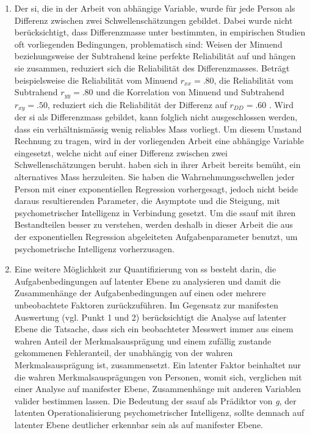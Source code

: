 \documentclass[11pt, twoside, a4paper]{book}		%
\begin{document}
\begin{enumerate}
	\item Der \gls{si}, die in der Arbeit von \citet{Melnick2013} abhängige Variable, wurde für jede Person als Differenz zwischen zwei Schwellenschätzungen gebildet. Dabei wurde nicht berücksichtigt, dass Differenzmasse unter bestimmten, in empirischen Studien oft vorliegenden Bedingungen, problematisch sind: Weisen der Minuend  beziehungsweise der Subtrahend keine perfekte Reliabilität auf und hängen sie zusammen, reduziert sich die Reliabilität des Differenzmasses. Beträgt beispielsweise die Reliabilität vom Minuend $r_{xx} = .80$, die Reliabilität vom Subtrahend $r_{yy} = .80$ und die Korrelation von Minuend und Subtrahend $r_{xy} = .50$, reduziert sich die Reliabilität der Differenz auf $r_{DD} = .60$ \citep[][S. 145]{Murphy2005}. Wird der \gls{si} als Differenzmass gebildet, kann folglich nicht ausgeschlossen werden, dass ein verhältnismässig wenig reliables Mass vorliegt. Um diesem Umstand Rechnung zu tragen, wird in der vorliegenden Arbeit eine abhängige Variable eingesetzt, welche nicht auf einer Differenz zwischen zwei Schwellenschätzungen beruht. \citeauthor{Melnick2013} haben sich in ihrer Arbeit bereits bemüht, ein alternatives Mass herzuleiten. Sie haben die Wahrnehmungsschwellen jeder Person mit einer exponentiellen Regression vorhergesagt, jedoch nicht beide daraus resultierenden Parameter, die Asymptote und die Steigung, mit psychometrischer Intelligenz in Verbindung gesetzt. Um die \gls{ssauf} mit ihren Bestandteilen besser zu verstehen, werden deshalb in dieser Arbeit die aus der exponentiellen Regression abgeleiteten Aufgabenparameter benutzt, um psychometrische Intelligenz vorherzusagen.

	\item Eine weitere Möglichkeit zur Quantifizierung von \gls{ss} besteht darin, die Aufgabenbedingungen auf latenter Ebene zu analysieren und damit die Zusammenhänge der Aufgabenbedingungen auf einen oder mehrere unbeobachtete Faktoren zurückzuführen. Im Gegensatz zur manifesten Auswertung (vgl. Punkt 1 und 2) berücksichtigt die Analyse auf latenter Ebene die Tatsache, dass sich ein beobachteter Messwert immer aus einem wahren Anteil der Merkmalsausprägung und einem zufällig zustande gekommenen Fehleranteil, der unabhängig von der wahren Merkmalsausprägung ist, zusammensetzt. Ein latenter Faktor beinhaltet nur die wahren Merkmalsausprägungen von Personen, womit sich, verglichen mit einer Analyse auf manifester Ebene, Zusammenhänge mit anderen Variablen valider bestimmen lassen. Die Bedeutung der \gls{ssauf} als Prädiktor von \textit{g}, der latenten Operationalisierung psychometrischer Intelligenz, sollte demnach auf latenter Ebene deutlicher erkennbar sein als auf manifester Ebene.


\end{enumerate}
\end{document}
